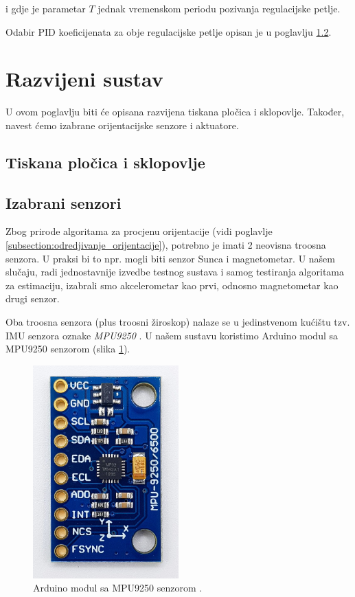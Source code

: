 \documentclass[times, utf8, diplomski, numeric]{templates/template}
\begin{document}
{{{{                i gdje je parametar $T$ jednak vremenskom periodu pozivanja regulacijske petlje.

                Odabir PID koeficijenata za obje regulacijske petlje opisan je u poglavlju \ref{}.
            }
        }
    }

    \section{Razvijeni sustav}{
        U ovom poglavlju biti će opisana razvijena tiskana pločica i sklopovlje. Također, navest ćemo izabrane orijentacijske senzore i aktuatore.

        \subsection{Tiskana pločica i sklopovlje}{
        }

        \subsection{Izabrani senzori}{
            Zbog prirode algoritama za procjenu orijentacije (vidi poglavlje \ref{subsection:odredjivanje_orijentacije}), potrebno je imati 2 neovisna troosna senzora. U praksi bi to npr. mogli biti senzor Sunca i magnetometar. U našem slučaju, radi jednostavnije izvedbe testnog sustava i samog testiranja algoritama za estimaciju, izabrali smo akcelerometar kao prvi, odnosno magnetometar kao drugi senzor. 

            Oba troosna senzora (plus troosni žiroskop) nalaze se u jedinstvenom kućištu tzv. IMU  senzora oznake \emph{MPU9250} \cite{mpu9250_datasheet}. U našem sustavu koristimo Arduino modul sa MPU9250 senzorom (slika \ref{fig:mpu9250}).

            \begin{figure}[htb]
            \centering
            \includegraphics[width=0.5\textwidth]{images/mpu9250.jpg}
            \caption{Arduino modul sa MPU9250 senzorom \cite{wolles_mpu9250}.}
            \label{fig:mpu9250}
            \end{figure}

}}}
\end{document}
